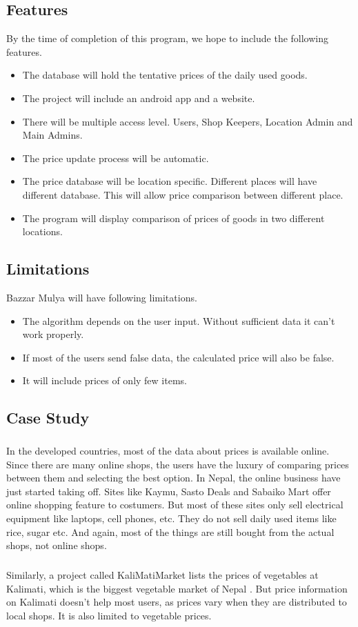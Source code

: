 \documentclass[12ptpt,a4paper]{article}
\begin{document}
		\subsection{Features}
			 By the time of completion of this program, we hope to include the following features.
			\begin{itemize}
			\item The database will hold the tentative prices of the daily used goods.
			\item The project will include an android app and a website.
			\item There will be multiple access level. Users, Shop Keepers, Location Admin and Main Admins.
			\item The price update process will be automatic.
			\item The price database will be location specific. Different places will have different database. This will allow price comparison between different place.
			\item The program will display comparison of prices of goods in two different locations. 
		\end{itemize}
		
		\subsection{Limitations}
		Bazzar Mulya will have following limitations.
		\begin{itemize}
			\item The algorithm depends on the user input. Without sufficient data it can't work properly.
			\item If most of the users send false data, the calculated price will also be false.
			\item It will include prices of only few items.
		\end{itemize}
		\subsection{Case Study}
		\subparagraph{} In the developed countries, most of the data about prices is available online. Since there are many online shops, the users have the luxury of comparing prices between them and selecting the best option. In Nepal, the online business have just started taking off. Sites like Kaymu, Sasto Deals and Sabaiko Mart offer online shopping feature to costumers. But most of these sites only sell electrical equipment like laptops, cell phones, etc. They do not sell daily used items like rice, sugar etc. And again, most of the things are still bought from the actual shops, not online shops.
		\subparagraph{} Similarly, a project called KaliMatiMarket lists the prices of vegetables at Kalimati, which is the biggest vegetable market of Nepal \cite{kalimati}. But price information on Kalimati doesn't help most users, as prices vary when they are distributed to local shops. It is also limited to vegetable prices.
\end{document}
